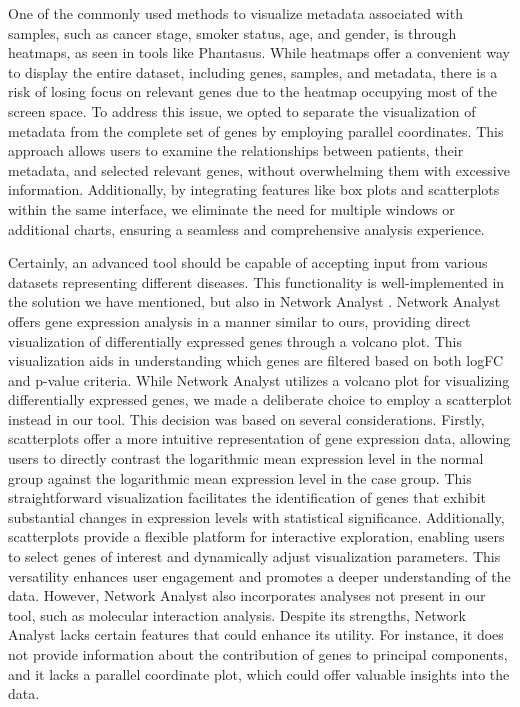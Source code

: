 \documentclass[
	a4paper, %
	10pt, %
	unnumberedsections, %
	twoside, %
]{LTJournalArticle}
\begin{document}
One of the commonly used methods to visualize metadata associated with samples, such as cancer stage, smoker status, age, and gender, is through heatmaps, as seen in tools like Phantasus. While heatmaps offer a convenient way to display the entire dataset, including genes, samples, and metadata, there is a risk of losing focus on relevant genes due to the heatmap occupying most of the screen space. To address this issue, we opted to separate the visualization of metadata from the complete set of genes by employing parallel coordinates. This approach allows users to examine the relationships between patients, their metadata, and selected relevant genes, without overwhelming them with excessive information. Additionally, by integrating features like box plots and scatterplots within the same interface, we eliminate the need for multiple windows or additional charts, ensuring a seamless and comprehensive analysis experience.


Certainly, an advanced tool should be capable of accepting input from various datasets representing different diseases. This functionality is well-implemented in the solution we have mentioned, but also in Network Analyst \cite{10.1093/nar/gkz240}. Network Analyst offers gene expression analysis in a manner similar to ours, providing direct visualization of differentially expressed genes through a volcano plot. This visualization aids in understanding which genes are filtered based on both logFC and p-value criteria. While Network Analyst utilizes a volcano plot for visualizing differentially expressed genes, we made a deliberate choice to employ a scatterplot instead in our tool. This decision was based on several considerations. Firstly, scatterplots offer a more intuitive representation of gene expression data, allowing users to directly contrast the logarithmic mean expression level in the normal group against the logarithmic mean expression level in the case group. This straightforward visualization facilitates the identification of genes that exhibit substantial changes in expression levels with statistical significance. Additionally, scatterplots provide a flexible platform for interactive exploration, enabling users to select genes of interest and dynamically adjust visualization parameters. This versatility enhances user engagement and promotes a deeper understanding of the data. However, Network Analyst also incorporates analyses not present in our tool, such as molecular interaction analysis. Despite its strengths, Network Analyst lacks certain features that could enhance its utility. For instance, it does not provide information about the contribution of genes to principal components, and it lacks a parallel coordinate plot, which could offer valuable insights into the data.
\end{document}
